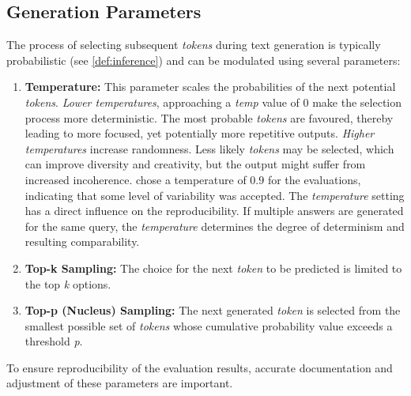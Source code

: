 \subsection{Generation Parameters}
%
The process of selecting subsequent \textit{tokens} during text generation is typically probabilistic (see \cref{def:inference}) and can be modulated using several parameters:
\begin{enumerate}
    \item \textbf{Temperature:}\label{item:temperature} This parameter scales the probabilities of the next potential \textit{tokens}.
    \textit{Lower temperatures}, approaching a \textit{temp} value of $0$ make the selection process more deterministic.
    The most probable \textit{tokens} are favoured, thereby leading to more focused, yet potentially more repetitive outputs.
    \textit{Higher temperatures} increase randomness.
    Less likely \textit{tokens} may be selected, which can improve diversity and creativity, but the output might suffer from increased incoherence.
    \citet{Paul_Keller} chose a temperature of $0.9$ for the evaluations, indicating that some level of variability was accepted.
    The \textit{temperature} setting has a direct influence on the reproducibility.
    If multiple answers are generated for the same query, the \textit{temperature} determines the degree of determinism and resulting comparability.
    \item \textbf{Top-k Sampling:}\label{item:top-k} The choice for the next \textit{token} to be predicted is limited to the top \textit{k} options.
    \item \textbf{Top-p (Nucleus) Sampling:}\label{item:top-p} The next generated \textit{token} is selected from the smallest possible set of \textit{tokens} whose cumulative probability value exceeds a threshold \textit{p}.
\end{enumerate}
To ensure reproducibility of the evaluation results, accurate documentation and adjustment of these parameters are important.
%
